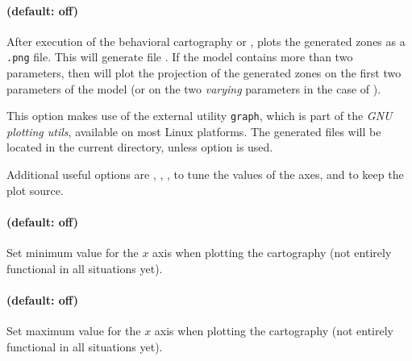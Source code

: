 



\paragraph{ (default: off)}

After execution of the behavioral cartography or \EFsynth{}, plots the generated zones as a \texttt{.png} file.
This will generate file .
If the model contains more than two parameters, then  will plot the projection of the generated zones on the first two parameters of the model (or on the two \emph{varying} parameters in the case of \BC{}).

This option makes use of the external utility \texttt{graph}, which is
part of the \emph{GNU plotting utils}, available on most Linux
platforms.
The generated files will be located in the current directory, unless option  is used.

Additional useful options are
,
,
,
to tune the values of the axes,
and  to keep the plot source.


\paragraph{ (default: off)}
Set minimum value for the $x$ axis when plotting the cartography (not entirely functional in all situations yet).

\paragraph{ (default: off)}
Set maximum value for the $x$ axis when plotting the cartography (not entirely functional in all situations yet).

